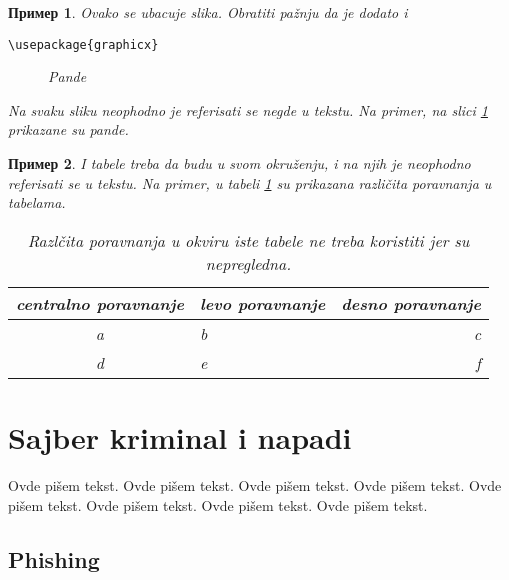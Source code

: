 \documentclass[a4paper]{article}
\newtheorem{primer}{Пример}[section] %
\begin{document}
{\begin{primer} Ovako se ubacuje slika. Obratiti pažnju da je dodato i 
\begin{verbatim}
\usepackage{graphicx}
\end{verbatim}

\begin{figure}[h!]
\begin{center}
\end{center}
\caption{Pande}
\label{fig:pande}
\end{figure}

Na svaku sliku neophodno je referisati se negde u tekstu. Na primer, na slici \ref{fig:pande} prikazane su pande. 
\end{primer}

\begin{primer} I tabele treba da budu u svom okruženju, i na njih je neophodno referisati se u tekstu. Na primer, u tabeli \ref{tab:tabela1} su prikazana različita poravnanja u tabelama.

\begin{table}[h!]
\begin{center}
\caption{Razlčita poravnanja u okviru iste tabele ne treba koristiti jer su nepregledna.}
\begin{tabular}{|c|l|r|} \hline
centralno poravnanje& levo poravnanje& desno poravnanje\\ \hline
a &b&c\\ \hline
d &e&f\\ \hline
\end{tabular}
\label{tab:tabela1}
\end{center}
\end{table}

\end{primer}





\section{Sajber kriminal i napadi}
\label{sec:kriminal_napadi}


Ovde pišem tekst. 
Ovde pišem tekst. 
Ovde pišem tekst. 
Ovde pišem tekst. 
Ovde pišem tekst. 
Ovde pišem tekst. 
Ovde pišem tekst. 
Ovde pišem tekst. 


\subsection{Phishing}
\label{subsec:phishing}

}
\end{document}
